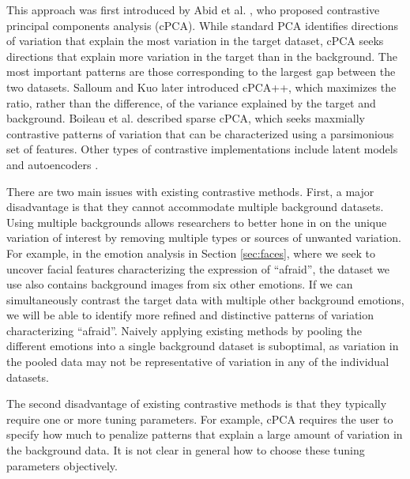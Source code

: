 \documentclass[12pt]{article}
\begin{document}
This approach was first introduced by Abid et al. \cite{Abid}, who proposed contrastive principal components analysis (cPCA). While standard PCA identifies directions of variation that explain the most variation in the target dataset, cPCA seeks directions that explain more variation in the target than in the background. The most important patterns are those corresponding to the largest gap between the two datasets. Salloum and Kuo \cite{Salloum} later introduced cPCA++, which maximizes the ratio, rather than the difference, of the variance explained by the target and background. Boileau et al. \cite{Boileau} described sparse cPCA, which seeks maxmially contrastive patterns of variation that can be characterized using a parsimonious set of features. Other types of contrastive implementations include latent models \cite{severson2019unsupervised} and autoencoders \cite{cautoencoder}.

There are two main issues with existing contrastive methods. First, a major disadvantage is that they cannot accommodate multiple background datasets. Using multiple backgrounds allows researchers to better hone in on the unique variation of interest by removing multiple types or sources of unwanted variation.
For example, in the emotion analysis in Section \ref{sec:faces}, where we seek to uncover facial features characterizing the expression of ``afraid'', the dataset we use also contains background images from six other emotions. If we can simultaneously contrast the target data with multiple other background emotions, we will be able to identify more refined and distinctive patterns of variation characterizing ``afraid''. Naively applying existing methods by pooling the different emotions into a single background dataset is suboptimal, as variation in the pooled data may not be representative of variation in any of the individual datasets.

The second disadvantage of existing contrastive methods is that they typically require one or more tuning parameters. For example, cPCA requires the user to specify how much to penalize patterns that explain a large amount of variation in the background data. It is not clear in general how to choose these tuning parameters objectively.
\end{document}

